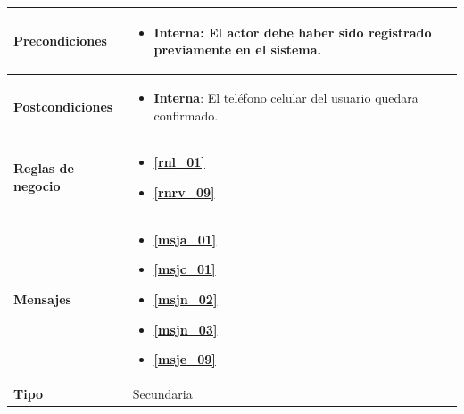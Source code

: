 \begin{center}
\begin{longtable}{| p{3.5cm} | p{11.5cm} |}
        \hline	
          \textbf{Precondiciones} & 
            \begin{itemize}
              \item \textbf{Interna}: El actor debe haber sido registrado previamente en el sistema.
            \end{itemize} \\
        \hline	
          \textbf{Postcondiciones} & 
            \begin{itemize}
              \item \textbf{Interna}: El teléfono celular del usuario quedara confirmado.
            \end{itemize} \\
        \hline
          \textbf{Reglas de negocio} &
            \begin{itemize}
              \item \textbf{\ref{rnl_01}}
              \item \textbf{\ref{rnrv_09}}
            \end{itemize} \\
        \hline
          \textbf{Mensajes} & 
            \begin{itemize}
              \item \textbf{\ref{msja_01}}
              \item \textbf{\ref{msjc_01}}
              \item \textbf{\ref{msjn_02}}
              \item \textbf{\ref{msjn_03}}
              \item \textbf{\ref{msje_09}}
            \end{itemize} \\
        \hline
          \textbf{Tipo} & Secundaria\\
        \hline	    
  \end{longtable}
\end{center}
\endgroup

